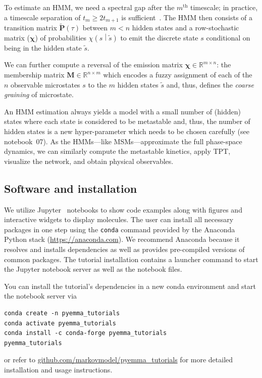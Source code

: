 \documentclass[9pt,tutorial]{livecoms}
\newcommand{\githubrepository}{\url{github.com/markovmodel/pyemma_tutorials}}
\begin{document}
To estimate an HMM, we need a spectral gap after the $m^\textrm{th}$ timescale;
in practice, a timescale separation of $t_m \geq 2t_{m+1}$ is sufficient~\cite{pyemma}.
The HMM then consists of a transition matrix $\tilde{\mathbf{P}}(\tau)$ between $m<n$ hidden states
and a row-stochastic matrix ($\bm{\chi}$) of probabilities $\chi\left( s \middle| \tilde{s} \right)$
to emit the discrete state $s$ conditional on being in the hidden state $\tilde{s}$.

We can further compute a reversal of the emission matrix $\bm{\chi}\in\mathbb{R}^{m \times n}$:
the membership matrix $\mathbf{M}\in\mathbb{R}^{n \times m}$ which encodes
a fuzzy assignment of each of the $n$ observable microstates $s$ to the $m$ hidden states $\tilde{s}$ and,
thus, defines the \emph{coarse graining} of microstate.

An HMM estimation always yields a model with a small number of (hidden) states
where each state is considered to be metastable and,
thus, the number of hidden states is a new hyper-parameter which needs to be chosen carefully (see notebook~07).
As the HMMs---like MSMs---approximate the full phase-space dynamics,
we can similarly compute the metastable kinetics, apply TPT, visualize the network, and obtain physical observables.

\subsection{Software and installation}

We utilize Jupyter~\cite{jupyter} notebooks to show code examples along with figures and interactive widgets to display molecules.
The user can install all necessary packages in one step using the \texttt{conda} command provided by the Anaconda Python stack (\url{https://anaconda.com}).
We recommend Anaconda because it resolves and installs dependencies as well as provides pre-compiled versions of common packages.
The tutorial installation contains a launcher command to start the Jupyter notebook server as well as the notebook files.

You can install the tutorial's dependencies in a new conda environment and start the notebook server via
\begin{verbatim}
conda create -n pyemma_tutorials
conda activate pyemma_tutorials
conda install -c conda-forge pyemma_tutorials
pyemma_tutorials
\end{verbatim}
or refer to \githubrepository{} for more detailed installation and usage instructions.
\end{document}

